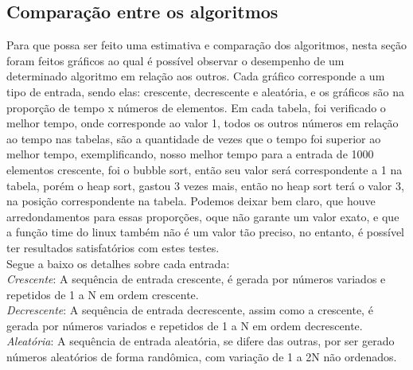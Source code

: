 \documentclass[
	12pt,				%
	oneside,			%
	a4paper,			%
	english,			%
	brazil,				%
	]{article}
\begin{document}
\subsection{Comparação entre os algoritmos}
Para que possa ser feito uma estimativa e comparação dos algoritmos, nesta seção foram feitos gráficos ao qual é possível observar o desempenho de um determinado algoritmo
em relação aos outros. Cada gráfico corresponde a um tipo de entrada, sendo elas: crescente, decrescente e aleatória, e os gráficos são na proporção de tempo x números de 
elementos. Em cada tabela, foi verificado o melhor tempo, onde corresponde ao valor 1, todos os outros números em relação ao tempo nas tabelas, são a quantidade de 
vezes que o tempo foi superior ao melhor tempo, exemplificando, nosso melhor tempo 	para a entrada de 1000 elementos crescente, foi o bubble sort, então seu valor será correspondente a
1 na tabela, porém o heap sort, gastou 3 vezes mais, então no heap sort terá o valor 3, na posição correspondente na tabela. Podemos deixar bem claro, que houve arredondamentos para essas proporções,
oque não garante um valor exato, e que a função time do linux também não é um valor tão preciso, no entanto, é possível ter resultados satisfatórios com estes testes.\\
Segue a baixo os detalhes sobre cada entrada: \\
\indent \textit{Crescente}: A sequência de entrada crescente, é gerada por números variados e repetidos de 1 a N em ordem crescente.\\
\indent \textit{Decrescente}: A sequência de entrada decrescente, assim como a crescente, é gerada por números variados e repetidos de 1 a N em ordem decrescente.\\
\indent \textit{Aleatória}: A sequência de entrada aleatória, se difere das outras, por ser gerado números aleatórios de forma randômica, com variação de 1 a 2N não ordenados.\\
\end{document}
